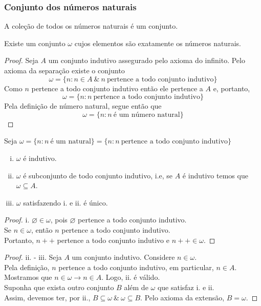       \subsubsection{Conjunto dos números naturais}
         A coleção de todos os números naturais é um conjunto.
         \begin{theorem}
            Existe um conjunto $\omega$ cujos elementos são 
            exatamente os números naturais.
            \begin{proof}
               Seja $A$ um conjunto indutivo assegurado pelo axioma do infinito.
               Pelo axioma da separação existe o conjunto
               $$\omega = \{n:n \in A\ \&\ n\ 
               \textrm{pertence a todo conjunto indutivo}\}$$
               Como $n$ pertence a todo conjunto indutivo então ele pertence a 
               $A$ e, portanto, $$\omega = \{n: n\ 
               \textrm{pertence a todo conjunto indutivo}\}$$
               Pela definição de número natural, segue então que
               $$\omega = \{n: n\ \textrm{é um número natural}\}$$
            \end{proof}
         \end{theorem}
         \begin{theorem}
            Seja $\omega = \{n: n\ \textrm{é um natural}\} = 
            \{n: n\ \textrm{pertence a todo conjunto indutivo}\}$
            \begin{enumerate}[i.]
               \item $\omega$ é indutivo.
               \item $\omega$ é subconjunto de todo conjunto indutivo,
                  i.e, se $A$ é indutivo temos que $\omega \subseteq A$.
               \item $\omega$ satisfazendo i. e ii. é único.
            \end{enumerate}
            \begin{proof}
                i. $\varnothing \in \omega$, pois $\varnothing$ pertence a 
                todo conjunto indutivo.\\
                Se $n \in \omega$, então $n$ pertence a todo conjunto indutivo.\\
                Portanto, $n++$ pertence a todo conjunto indutivo e $n++ \in \omega$.
            \end{proof}
            \begin{proof}
                ii. - iii. Seja $A$ um conjunto indutivo. Considere $n\in \omega$.\\
                Pela definição, $n$ pertence a todo conjunto indutivo, 
                em particular, $n \in A$.\\ 
                Mostramos que $n \in \omega \rightarrow n \in A$. 
                Logo, ii. é válido.\\
                Suponha que exista outro conjunto $B$ além de $\omega$
                que satisfaz i. e ii.\\
                Assim, devemos ter, por ii., $B\subseteq \omega\ \&\
                \omega \subseteq B$. Pelo axioma da extensão, $B = \omega$.
            \end{proof}
         \end{theorem}

